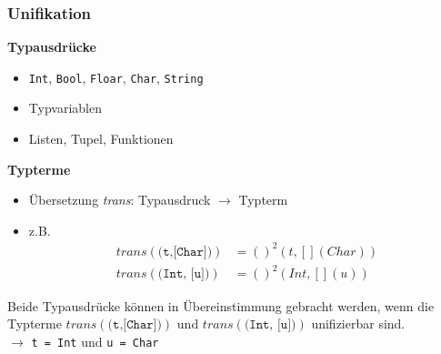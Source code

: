 \documentclass{beamer}
\begin{document}
\begin{frame}[fragile] \frametitle{Unifikation}
	\small
	\textbf{Typausdrücke}
	\begin{itemize}
		\item \texttt{Int}, \texttt{Bool}, \texttt{Floar}, \texttt{Char}, \texttt{String}
		\item Typvariablen
		\item Listen, Tupel, Funktionen
	\end{itemize}

	\textbf{Typterme}
	\begin{itemize}
		\item Übersetzung \textit{trans}: Typausdruck $\to$ Typterm
		\item z.B.
		\begin{equation*}
			\begin{aligned}
				trans(\texttt{(t,[Char])}) &= ()^2(t, [](Char)) \\
				trans(\texttt{(Int, [u])}) &= ()^2(Int, [](u))
			\end{aligned}
		\end{equation*}
	\end{itemize}

	\pause
	
	Beide Typausdrücke können in Übereinstimmung gebracht werden, wenn die Typterme $trans(\texttt{(t,[Char])})$ und $trans(\texttt{(Int, [u])})$ unifizierbar sind.
	\\ \pause
	$\to$ \texttt{t = Int} und \texttt{u = Char}
\end{frame}
\end{document}
